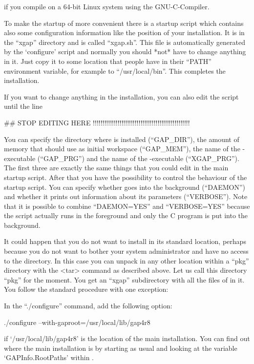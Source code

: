 if you compile on a 64-bit Linux system using the GNU-C-Compiler.


To make the startup of {\XGAP} more convenient there is a startup script
which contains also some configuration information like the position of
your {\GAP} installation. It is in the ``xgap'' directory
and is called ``xgap.sh''. This file is automatically generated
by the `configure' script and normally you should *not* have to change 
anything in it. Just copy it to some location that people have in their
``PATH'' environment variable, for example to ``/usr/local/bin''.
This completes the installation.

If you want to change anything in the installation, you
can also edit the script until the line

\begintt
##  STOP EDITING HERE !!!!!!!!!!!!!!!!!!!!!!!!!!!!!!!!!!!!!!!!!!!!!!!!!!!
\endtt

You can specify the directory where {\GAP} is installed (``GAP\_DIR''), 
the amount of memory that {\GAP} should use as initial workspace
(``GAP\_MEM''), the name of the {\GAP}-executable (``GAP\_PRG'') and the
name of the {\XGAP}-executable (``XGAP\_PRG''). The first three are exactly 
the same things that you could edit in the main {\GAP} startup script.
After that you have the possibility to control the behaviour of the {\XGAP}
startup script. You can specify whether {\XGAP} goes into the background
(``DAEMON'') and whether it prints out information about its parameters
(``VERBOSE''). Note that it is possible to combine ``DAEMON=YES''
and ``VERBOSE=YES'' because the script actually runs in the foreground and
only the C program is put into the background.



It could happen that you do not want to install {\XGAP} in its
standard location, perhaps because you do not want to bother your
system administrator and have no access to the {\GAP} directory. In
this case you can unpack {\XGAP} in any other location within a
``pkg'' directory with the <tar> command as described above. Let us
call this directory ``pkg'' for the moment. You get an ``xgap''
subdirectory with all the files of {\XGAP} in it. You follow the
standard procedure with one exception:

In the ``./configure'' command, add the following option:

\begintt
./configure --with-gaproot=/usr/local/lib/gap4r8
\endtt

if `/usr/local/lib/gap4r8' is the location of the main {\GAP} installation.
You can find out where the main {} installation is by starting 
{\GAP} as usual and looking at the variable `GAPInfo.RootPaths' 
within {\GAP}.
